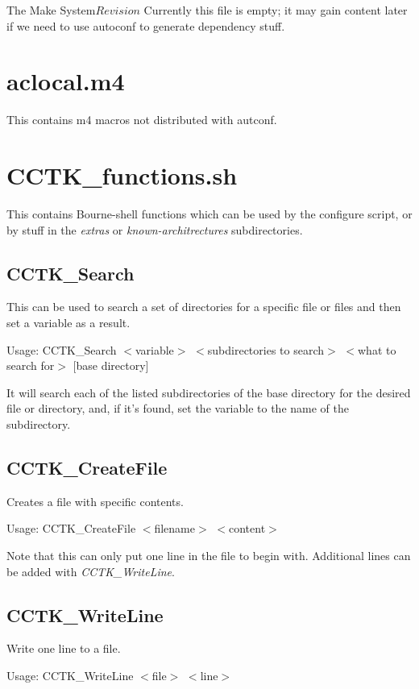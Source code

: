 \begin{cactuspart}{3}{The Make System}{}{$Revision$}
Currently this file is empty;  it may gain content later if we need to
use autoconf to generate dependency stuff.

\section{aclocal.m4}
\label{sec:autoconf:aclocal}

This contains m4 macros not distributed with autconf.

\section{CCTK\_functions.sh}
\label{sec:autoconf:functions}

This contains Bourne-shell functions which can be used by 
the configure script, or by stuff in the {\em extras} or 
{\em known-architrectures} subdirectories.

\subsection{CCTK\_Search}

This can be used to search a set of directories for a specific file
or files and then set a variable as a result.

Usage: CCTK\_Search $<$variable$>$ $<$subdirectories to search$>$ $<$what to search for$>$ [base directory]

It will search each of the listed subdirectories of the base directory for the desired
file or directory, and, if it's found, set the variable to the name of the subdirectory.

\subsection{CCTK\_CreateFile}

Creates a file with specific contents.

Usage: CCTK\_CreateFile $<$filename$>$ $<$content$>$ 

Note that this can only put one line in the file to begin with.  Additional
lines can be added with {\em CCTK\_WriteLine}.

\subsection{CCTK\_WriteLine}

Write one line to a file.

Usage: CCTK\_WriteLine $<$file$>$ $<$line$>$


\end{cactuspart}
